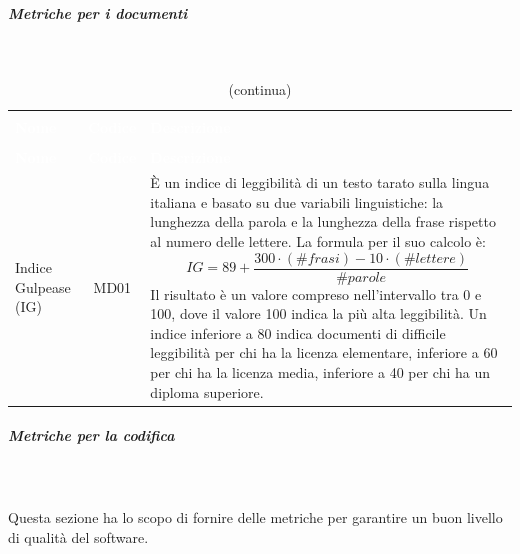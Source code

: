 \subparagraph{Metriche per i documenti}\mbox{} \\ 
\begin{longtable}{ C{4.5cm} c L{9.5cm} }
	\caption{Metriche dei documenti}\\
		\textcolor{white}{\textbf{Nome}} & \textcolor{white}{\textbf{Codice}} & \centerline{\textcolor{white}{\textbf{Descrizione}}} \\
		\endfirsthead
		\caption[]{(continua)} \\
		\textcolor{white}{\textbf{Nome}} & \textcolor{white}{\textbf{Codice}} & \centerline{\textcolor{white}{\textbf{Descrizione}}} \\
		\endhead
		Indice Gulpease (IG)  & MD01 & È un indice di leggibilità di un testo tarato sulla lingua italiana e basato su due variabili linguistiche: la lunghezza della parola e la lunghezza della frase rispetto al numero delle lettere. La formula per il suo calcolo è: \newline
\[ IG = 89 + \frac{300 \cdot (\#frasi) - 10 \cdot (\#lettere)}{\#parole} \] \newline
Il risultato è un valore compreso nell'intervallo tra 0 e 100, dove il valore 100 indica la più alta leggibilità. Un indice inferiore a 80 indica documenti di difficile leggibilità per chi ha la licenza elementare, inferiore a 60 per chi ha la licenza media, inferiore a 40 per chi ha un diploma superiore.
	\\	
	\end{longtable}
	\pagebreak
\subparagraph{Metriche per la codifica} \mbox{} \\ \mbox{} \\
Questa sezione ha lo scopo di fornire delle metriche per garantire un buon livello di qualità del software.
